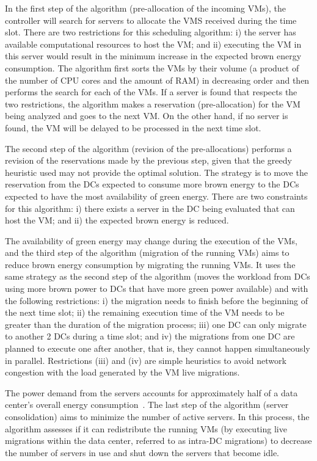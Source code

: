 In the first step of the algorithm (pre-allocation of the incoming VMs), the controller will search for servers to allocate the VMS received during the time slot. There are two restrictions for this scheduling algorithm: i) the server has available computational resources to host the VM;  and ii) executing the VM in this server would result in the minimum increase in the expected brown energy consumption. The algorithm first sorts the VMs by their volume (a product of the number of CPU cores and the amount of RAM) in decreasing order and then performs the search for each of the VMs. If a server is found that respects the two restrictions, the algorithm makes a reservation (pre-allocation) for the VM being analyzed and goes to the next VM. On the other hand, if no server is found, the VM will be delayed to be processed in the next time slot.

The second step of the algorithm (revision of the pre-allocations) performs a revision of the reservations made by the previous step, given that the greedy heuristic used may not provide the optimal solution.  The strategy is to move the reservation from the DCs expected to consume more brown energy to the DCs expected to have the most availability of green energy.  There are two constraints for this algorithm: i) there exists a server in the DC being evaluated that can host the VM; and ii) the expected brown energy is reduced.

The availability of green energy may change during the execution of the VMs, and the third step of the algorithm (migration of the running VMs) aims to reduce brown energy consumption by migrating the running VMs. It uses the same strategy as the second step of the algorithm (moves the workload from DCs using more brown power to DCs that have more green power available) and with the following restrictions: i) the migration needs to finish before the beginning of the next time slot; ii) the remaining execution time of the VM needs to be greater than the duration of the migration process; iii) one DC can only migrate to another 2 DCs during a time slot; and iv) the migrations from one DC are planned to execute one after another, that is, they cannot happen simultaneously in parallel. Restrictions (iii) and (iv) are simple heuristics to avoid network congestion with the load generated by the VM live migrations.

The power demand from the servers accounts for approximately half of a data center's overall energy consumption~\cite{power_to_the_people}. The last step of the algorithm (server consolidation) aims to minimize the number of active servers. In this process, the algorithm assesses if it can redistribute the running VMs (by executing live migrations within the data center, referred to as intra-DC migrations) to decrease the number of servers in use and shut down the servers that become idle.

